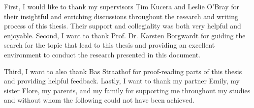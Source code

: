 First, I would like to thank my supervisors Tim Kucera and Leslie O'Bray for
their insightful and enriching discussions throughout the research and writing
process of this thesis. Their support and collegiality was both very helpful and
enjoyable. Second, I want to thank Prof. Dr. Karsten Borgwardt for guiding the
search for the topic that lead to this thesis and providing an excellent
environment to conduct the research presented in this document.

Third, I want to also thank Bas Straathof for proof-reading parts of this thesis
and providing helpful feedback. Lastly, I want to thank my partner Emily, my
sister Flore,  my parents, and my family for supporting me throughout my
studies and without whom the following could not have been achieved.
